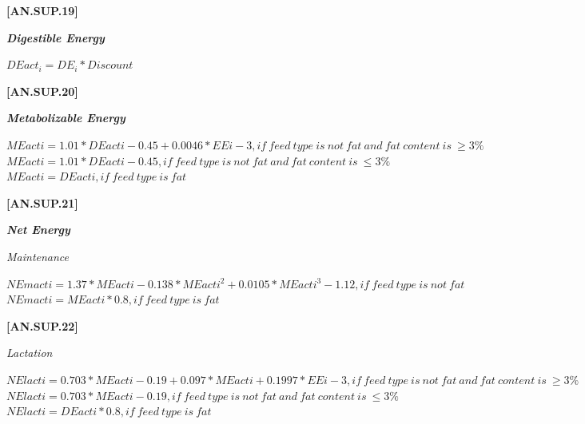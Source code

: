 \begin{refsection}
            {\raggedleft \textbf{[AN.SUP.19]}\par}
            \vspace{0.5cm}

    \textbf{\textit{Digestible Energy}} 
    \vspace{0.25cm}

    \begin{center}
    \(DEact_{i} = DE_{i} * Discount\)
    \end{center}
    \vspace{0.5cm}
    
            {\raggedleft \textbf{[AN.SUP.20]}\par}
            \vspace{0.5cm}

    \textbf{\textit{Metabolizable Energy}} 
    \vspace{0.25cm}

    \begin{center}
    \(MEacti = 1.01 * DEacti - 0.45 + 0.0046 * EEi - 3, if\ feed\ type\ is\ not\ fat\ and\ fat\ content\ is\ \geq 3\% \)
    \(MEacti = 1.01 * DEacti - 0.45 , if\ feed\ type\ is\ not\ fat\ and\ fat\ content\ is\ \leq 3\% \)
    \(MEacti = DEacti , if\ feed\ type\ is\ fat \)
    \end{center}
    \vspace{0.5cm}
    
            {\raggedleft \textbf{[AN.SUP.21]}\par}
            \vspace{0.5cm}

    \textbf{\textit{Net Energy}} 
    \vspace{0.25cm}

\textit{Maintenance}
    \begin{center}
    \(NEmacti = 1.37 * MEacti - 0.138 * MEacti^{2} + 0.0105 * MEacti^{3} - 1.12, if\ feed\ type\ is\ not\ fat \)
    \(NEmacti = MEacti * 0.8, if\ feed\ type\ is\ fat \)
    \end{center}
    \vspace{0.5cm}
    
            {\raggedleft \textbf{[AN.SUP.22]}\par}
            \vspace{0.5cm}

\textit{Lactation}
    \begin{center}
    \(NElacti = 0.703 * MEacti - 0.19 + 0.097 * MEacti + 0.1997 * EEi - 3, if\ feed\ type\ is\ not\ fat\ and\ fat\ content\ is\ \geq 3\% \)
    \(NElacti = 0.703 * MEacti - 0.19, if\ feed\ type\ is\ not\ fat\ and\ fat\ content\ is\ \leq 3\% \)
    \(NElacti = DEacti * 0.8, if\ feed\ type\ is\ fat \)
    \end{center}
    \vspace{0.5cm}
    

\end{refsection}
